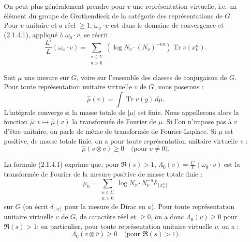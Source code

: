 \documentclass[12pt,a4paper]{article}
\theoremstyle{plain}
\theoremstyle{definition}
\theoremstyle{remark}
\DeclareMathOperator{\Tr}{Tr}
\begin{document}
On peut plus g\'en\'eralement prendre pour $v$ une repr\'esentation virtuelle, i.e. un \'el\'ement du groupe de Grothendieck de la cat\'egorie des repr\'esentations de $G$. Pour $v$ unitaire et $a$ r\'eel $\geq 1$, $\omega_a \cdot v$ est dans le domaine de convergence et (2.1.4.1), appliqu\'e \`a $\omega_a \cdot v$, se r\'ecrit :
\begin{equation}\label{eq:2.1.4.2}
\frac{L'}{L}(\omega_a \cdot v) = \sum_{\substack{\nu \in \Sigma \\ n > 0}} (\log N_\nu \cdot (N_\nu)^{-na}) \Tr v(x_\nu^n).
\end{equation}

Soit $\mu$ une mesure sur $G$, voire sur l'ensemble des classes de conjugaison de $G$. Pour toute repr\'esentation unitaire virtuelle $v$ de $G$, nous poserons :
\begin{equation}\label{eq:2.1.4.3}
\widehat{\mu}(v) = \int \Tr v(g)\, d\mu.
\end{equation}
L'int\'egrale converge si la masse totale de $|\mu|$ est finie. Nous appellerons alors la fonction $\widehat{\mu} : v \mapsto \widehat{\mu}(v)$ la transform\'ee de Fourier de $\mu$. Si l'on n'impose pas \`a $v$ d'\^etre unitaire, on parle de m\^eme de transform\'ee de Fourier-Laplace. Si $\mu$ est positive, de masse totale finie, on a pour toute repr\'esentation unitaire virtuelle $v$ :
\begin{equation}\label{eq:2.1.4.4}
\widehat{\mu}(v \otimes \overline{v}) \geq 0 \quad \text{(pour } v \neq 0 \text{)}.
\end{equation}

La formule (2.1.4.1) exprime que, pour $\Re(s) > 1$, $\Lambda_0(v) = \frac{L'}{L}(\omega_0 \cdot v)$ est la transform\'ee de Fourier de la mesure positive de masse totale finie :
\begin{equation}\label{eq:2.1.4.5}
\mu_0 = \sum_{\substack{\nu \in \Sigma \\ n > 0}} \log N_\nu \cdot N_\nu^{-n} \delta_{[x_\nu^n]}
\end{equation}
sur $G$ (on \'ecrit $\delta_{[a]}$ pour la mesure de Dirac en $a$). Pour toute repr\'esentation unitaire virtuelle $v$ de $G$, de caract\`ere r\'eel et $\geq 0$, on a donc $\Lambda_0(v) \geq 0$ pour $\Re(s) > 1$; en particulier, pour toute repr\'esentation unitaire virtuelle $v$, on a :
\begin{equation}\label{eq:2.1.4.6}
\Lambda_0(v \otimes \overline{v}) \geq 0 \quad \text{(pour } \Re(s) > 1 \text{)}.
\end{equation}
\end{document}
